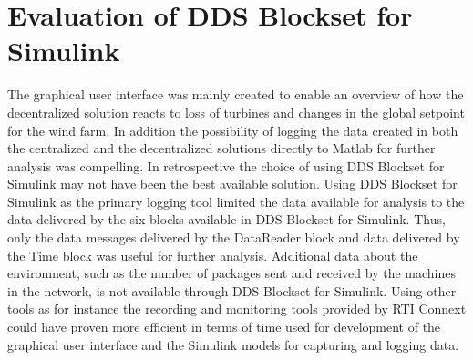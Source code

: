 \section{Evaluation of DDS Blockset for Simulink}
The graphical user interface was mainly created to enable an overview of how the decentralized solution reacts to loss of turbines and changes in the global setpoint for the wind farm. In addition the possibility of logging the data created in both the centralized and the decentralized solutions directly to Matlab for further analysis was compelling.
In retrospective the choice of using DDS Blockset for Simulink may not have been the best available solution. Using DDS Blockset for Simulink as the primary logging tool limited the data available for analysis to the data delivered by the six blocks available in DDS Blockset for Simulink.
Thus, only the data messages delivered by the DataReader block and data delivered by the Time block was useful for further analysis. Additional data about the environment, such as the number of packages sent and received by the machines in the network, is not available through DDS Blockset for Simulink.
Using other tools as for instance the recording and monitoring tools provided by RTI Connext could have proven more efficient in terms of time used for development of the graphical user interface and the Simulink models for capturing and logging data.